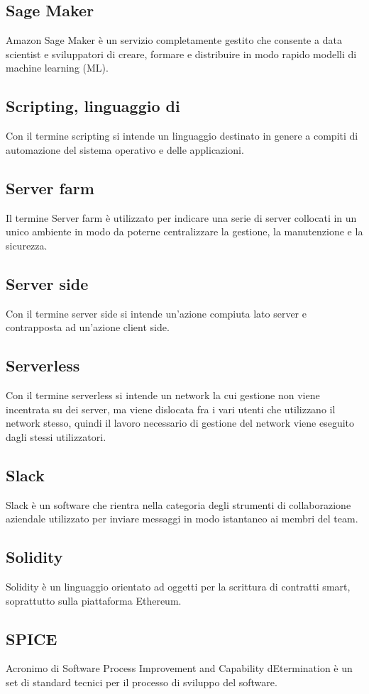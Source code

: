 \subsection{Sage Maker}  Amazon Sage Maker è un servizio completamente gestito che consente a data scientist e sviluppatori di creare, formare e distribuire in modo rapido modelli di machine learning (ML). 
\subsection{Scripting, linguaggio di}  Con il termine scripting si intende un linguaggio destinato in genere a compiti di automazione del sistema operativo e delle applicazioni.
\subsection{Server farm}  Il termine Server farm è utilizzato per indicare una serie di server collocati in un unico ambiente in modo da poterne centralizzare la gestione, la manutenzione e la sicurezza.
\subsection{Server side}  Con il termine server side si intende un'azione compiuta lato server e contrapposta ad un'azione client side.
\subsection{Serverless}  Con il termine serverless si intende un network la cui gestione non viene incentrata su dei server, ma viene dislocata fra i vari utenti che utilizzano il network stesso, quindi il lavoro necessario di gestione del network viene eseguito dagli stessi utilizzatori.
\subsection{Slack}  Slack è un software che rientra nella categoria degli strumenti di collaborazione aziendale utilizzato per inviare messaggi in modo istantaneo ai membri del team.
\subsection{Solidity}  Solidity è un linguaggio orientato ad oggetti per la scrittura di contratti smart, soprattutto sulla piattaforma Ethereum.
\subsection{SPICE}  Acronimo di Software Process Improvement and Capability dEtermination è un set di standard tecnici per il processo di sviluppo del software.
